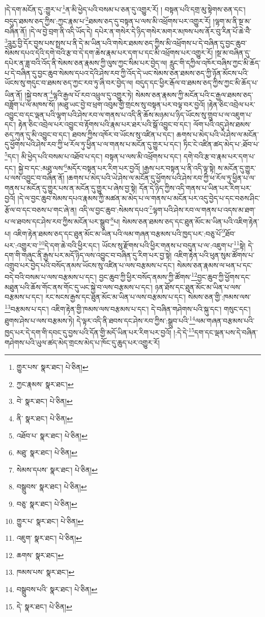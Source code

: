 །དེ་དག་མངོན་དུ་:གྱུར་པ་\footnote{གྱུར་པས་  སྣར་ཐང་།  པེ་ཅིན། }ན་མི་ཕྱེད་པའི་བསམ་པ་ཅན་དུ་འགྱུར་རོ། །
བསྟན་པའི་དགྲ་མུ་སྟེགས་ཅན་དང་། བདུད་ཐམས་ཅད་ཀྱིས་:ཀྱང་རྣམ་པ་\footnote{ཀྱང་རྣམས་  སྣར་ཐང་། }ཐམས་ཅད་དུ་བསྟན་པ་ལས་མི་འཕྲོགས་པར་འགྱུར་རོ། །ལྷག་མ་ནི་སྔ་མ་བཞིན་ནོ། །དེ་ལ་བྱེ་བྲག་ནི་འདི་ཡོད་དེ། དཔེར་ན་གསེར་དེ་ཉིད་གསེར་མགར་མཁས་པས་ནོར་བུ་རིན་པོ་ཆེ་བཻ་\footnote{བེ་  སྣར་ཐང་།  པེ་ཅིན། }ཌཱུརྱ་བྱི་དོར་བྱས་པས་སྤྲས་པ་ནི་དེ་མ་ཡིན་པའི་གསེར་ཐམས་ཅད་ཀྱིས་མི་འཕྲོགས་པ་དེ་བཞིན་དུ་བྱང་ཆུབ་སེམས་དཔའ་དེའི་དགེ་བའི་རྩ་བ་དེ་དག་ཆེས་རྣམ་པར་དག་པ་དང་མི་འཕྲོགས་པར་འགྱུར་རོ། །སྔ་མ་བཞིན་དུ་དཔེར་ན་ཟླ་བའི་འོད་ནི་སེམས་ཅན་རྣམས་ཀྱི་ལུས་ཀྱང་སིམ་པར་བྱེད་ལ། རླུང་གི་དཀྱིལ་འཁོར་བཞིས་ཀྱང་མི་ཆོད་པ་དེ་བཞིན་དུ་བྱང་ཆུབ་སེམས་དཔའ་དེའི་ཤེས་རབ་ཀྱི་འོད་དེ་ཡང་སེམས་ཅན་ཐམས་ཅད་ཀྱི་ཉོན་མོངས་པའི་ཡོངས་སུ་གདུང་བ་ཐམས་ཅད་ཀྱང་རབ་ཏུ་ཞི་བར་བྱེད་ལ། བདུད་དང་ཕྱིར་རྒོལ་བ་ཐམས་ཅད་ཀྱིས་ཀྱང་མི་ཆོད་པ་ཡིན་ནོ། །སྐྱེ་བས་ན་\footnote{ནི་  སྣར་ཐང་།  པེ་ཅིན། }ལྷའི་རྒྱལ་པོ་རབ་འཕྲུལ་དུ་འགྱུར་ཏེ། སེམས་ཅན་རྣམས་ཀྱི་མངོན་པའི་ང་རྒྱལ་ཐམས་ཅད་བཟློག་པ་ལ་མཁས་སོ། །མཐུ་ཡང་བྱེ་བ་ཕྲག་འབུམ་གྱི་གྲངས་སུ་བསྟན་པར་བལྟ་བར་བྱའོ། །རྟེན་ཅིང་འབྲེལ་པར་འབྱུང་བ་དང་ལྡན་པའི་ལྷག་པའི་ཤེས་རབ་ལ་གནས་པ་འདི་ནི་ཆོས་མཉམ་པ་ཉིད་ཡོངས་སུ་གྲུབ་པ་ལ་འཇུག་པ་དང་། རྟེན་ཅིང་འབྲེལ་པར་འབྱུང་བ་རྟོགས་པའི་རྣམ་པར་ཐར་པའི་སྒོ་འབྱུང་བ་དང་། ལོག་པའི་འདུ་ཤེས་ཐམས་ཅད་ཀུན་དུ་མི་འབྱུང་བ་དང་། ཐབས་ཀྱིས་འཁོར་བ་ཡོངས་སུ་འཛིན་པ་དང་། ཆགས་པ་མེད་པའི་ཡེ་ཤེས་ལ་མངོན་དུ་ཕྱོགས་པའི་ཤེས་རབ་ཀྱི་ཕ་རོལ་ཏུ་ཕྱིན་པ་ལ་གནས་པ་མངོན་དུ་གྱུར་པ་དང་། ཏིང་ངེ་འཛིན་ཚད་མེད་པ་:ཐོབ་པ་\footnote{འཐོབ་པ་  སྣར་ཐང་།  པེ་ཅིན། }དང་། མི་ཕྱེད་པའི་བསམ་པ་འཐོབ་པ་དང་། བསྟན་པ་ལས་མི་འཕྲོགས་པ་དང་། དགེ་བའི་རྩ་བ་རྣམ་པར་དག་པ་དང་། སྐྱེ་བ་དང་:མཐུ་ལས་\footnote{མཐུ་  སྣར་ཐང་།  པེ་ཅིན། }མདོར་བསྟན་པར་རིག་པར་བྱའོ། །རྒྱས་པར་བསྟན་པ་ནི་འདི་ལྟ་སྟེ། ས་མངོན་དུ་གྱུར་པ་ལས་འབྱུང་བ་བཞིན་ནོ། །ཆགས་པ་མེད་པའི་ཡེ་ཤེས་ལ་མངོན་དུ་ཕྱོགས་པའི་ཤེས་རབ་ཀྱི་ཕ་རོལ་ཏུ་ཕྱིན་པ་ལ་གནས་པ་མངོན་དུ་གྱུར་པས་ན་མངོན་དུ་གྱུར་པ་ཞེས་བྱ་སྟེ། དོན་དེ་ཉིད་ཀྱིས་འདི་གནས་པ་ཡིན་པར་རིག་པར་བྱའོ། །དེ་ལ་བྱང་ཆུབ་སེམས་དཔའ་རྣམས་ཀྱི་མཚན་མ་མེད་པ་ལ་གནས་པ་མངོན་པར་འདུ་བྱེད་པ་དང་བཅས་ཤིང་རྩོལ་བ་དང་བཅས་པ་གང་ཞེ་ན། འདི་ལ་བྱང་ཆུབ་:སེམས་དཔའ་\footnote{སེམས་དཔས་  སྣར་ཐང་།  པེ་ཅིན། }ལྷག་པའི་ཤེས་རབ་ལ་གནས་པ་འདས་མ་ཐག་པ་ལ་ཐབས་དང་ཤེས་རབ་ཀྱིས་མངོན་པར་སྒྲུབ་\footnote{བསྒྲུབས་  སྣར་ཐང་།  པེ་ཅིན། }པ། སེམས་ཅན་ཐམས་ཅད་དང་ཐུན་མོང་མ་ཡིན་པའི་འཇིག་རྟེན་པ། འཇིག་རྟེན་ཐམས་ཅད་དང་ཐུན་མོང་མ་ཡིན་པའི་ལམ་གཞན་བརྩམས་པའི་ཁྱད་པར་:བཅུ་པོ་\footnote{བཅུ་  སྣར་ཐང་།  པེ་ཅིན། }ཐོབ་པར་:འགྱུར་བ་\footnote{གྱུར་པ་  སྣར་ཐང་།  པེ་ཅིན། }དེ་དག་ཆེ་བའི་ཕྱིར་དང་། ཡོངས་སུ་རྫོགས་པའི་ཕྱིར་གནས་པ་བདུན་པ་ལ་:འཇུག་པ་\footnote{འཇུག་  སྣར་ཐང་།  པེ་ཅིན། }སྟེ། དེ་དག་གི་གཞུང་ནི་རྒྱས་པར་མདོ་ཉིད་ལས་འབྱུང་བ་བཞིན་དུ་རིག་པར་བྱ་སྟེ། འཇིག་རྟེན་པའི་ཕུན་སུམ་ཚོགས་པ་འགྲུབ་པར་བྱེད་པའི་བསོད་ནམས་ཡོངས་སུ་འཛིན་པ་ལས་བརྩམས་པ་དང་། སེམས་ཅན་རྣམས་ལ་ཕན་པ་དང་བདེ་བའི་བསམ་པ་ལས་བརྩམས་པ་དང་། བྱང་ཆུབ་ཀྱི་ཕྱིར་བསོད་ནམས་ཀྱི་ཚོགས་\footnote{ཆགས་  སྣར་ཐང་། }བྱང་ཆུབ་ཀྱི་ཕྱོགས་དང་མཐུན་པའི་ཆོས་གོང་ནས་གོང་དུ་ཡང་སྐྱེ་བ་ལས་བརྩམས་པ་དང་། ཉན་ཐོས་དང་ཐུན་མོང་མ་ཡིན་པ་ལས་བརྩམས་པ་དང་། རང་སངས་རྒྱས་དང་ཐུན་མོང་མ་ཡིན་པ་ལས་བརྩམས་པ་དང་། སེམས་ཅན་གྱི་:ཁམས་ལས་\footnote{ཁམས་པས་  སྣར་ཐང་། }བརྩམས་པ་དང་། འཇིག་རྟེན་གྱི་ཁམས་ལས་བརྩམས་པ་དང་། དེ་བཞིན་གཤེགས་པའི་སྐུ་དང་། གསུང་དང་། ཐུགས་ཤེས་པ་ལས་བརྩམས་ཏེ། དེ་ལྟར་འདི་ནི་ཐབས་དང་ཤེས་རབ་ཀྱིས་:སྒྲུབ་པའི་\footnote{བསྒྲུབས་པའི་  སྣར་ཐང་།  པེ་ཅིན། }ལམ་གཞན་བརྩམས་པའི་ཁྱད་པར་དེ་དག་གི་དབང་དུ་བྱས་པའི་དོན་གྱི་མདོ་ཡིན་པར་རིག་པར་བྱའོ། །:དེ་དེ་\footnote{དེ་  སྣར་ཐང་།  པེ་ཅིན། }དག་དང་ལྡན་པས་དེ་བཞིན་གཤེགས་པའི་ཡུལ་ཚད་མེད་གྲངས་མེད་པ་ཁོང་དུ་ཆུད་པར་འགྱུར་རོ། 